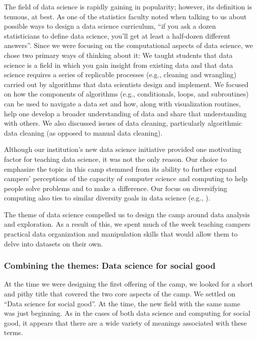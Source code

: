 The field of data science is rapidly gaining in popularity; however,
its definition is tenuous, at best.  As one of the statistics faculty
noted when talking to us about possible ways to design a data science
curriculum, ``if you ask a dozen statisticians to define data
science, you'll get at least a half-dozen different answers''.
Since we were focusing on the computational aspects of data science,
we chose two primary ways of thinking about it: We taught students
that data science is a field in which you gain insight from existing
data and that data science requires a series of replicable processes
(e.g., cleaning and wrangling) carried out by algorithms that data
scientists design and implement.  We focused on how the components
of algorithms (e.g., conditionals,  loops, and subroutines) can be
used to navigate a data set and how, along with visualization
routines, help one develop a broader understanding of data and share
that understanding with others.  We also discussed issues of data
cleaning, particularly algorithmic data cleaning (as opposed to
manual data cleaning).

Although our institution's new data science initiative provided one
motivating factor for teaching data science, it was not the only
reason.  Our choice to emphasize the topic in this camp stemmed
from its ability to further expand campers' perceptions of the
capacity of computer science and computing to help people solve problems
and to make a difference.  Our focus on diversifying computing also
ties to similar diversity goals in data science (e.g., \cite{Berman2015}).

The theme of data science compelled us to design the camp around
data analysis and exploration. As a result of this, we spent much
of the week teaching campers practical data organization and
manipulation skills that would allow them to delve into datasets
on their own.

\subsubsection{Combining the themes: Data science for social good}

At the time we were designing the first offering of the camp, we looked
for a short and pithy title that covered the two core aspects of the camp.
We settled on ``Data science for social good''.  At the time, the
new field with the same name was just beginning.  As in the cases of
both data science and computing for social good, it appears that there
are a wide variety of meanings associated with these terms.

